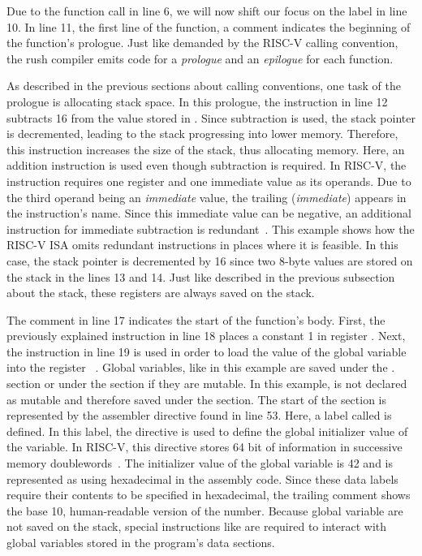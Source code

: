 Due to the function call in line 6, we will now shift our focus on the  label in line 10.
In line 11, the first line of the  function, a comment indicates the beginning of the function's prologue.
Just like demanded by the RISC-V calling convention, the rush compiler emits code for a \emph{prologue} and an \emph{epilogue} for each function.

As described in the previous sections about calling conventions, one task of the prologue is allocating stack space.
In this prologue, the  instruction in line 12 subtracts 16 from the value stored in .
Since subtraction is used, the stack pointer is decremented, leading to the stack progressing into lower memory.
Therefore, this instruction increases the size of the stack, thus allocating memory.
Here, an addition instruction is used even though subtraction is required.
In RISC-V, the  instruction requires one register and one immediate value as its operands.
Due to the third operand being an \emph{immediate} value, the trailing  (\emph{immediate}) appears in the instruction's name.
Since this immediate value can be negative, an additional instruction for immediate subtraction is redundant~\cite[reference card]{Patterson2017}.
This example shows how the RISC-V ISA omits redundant instructions in places where it is feasible.
In this case, the stack pointer is decremented by 16 since two 8-byte values are stored on the stack in the lines 13 and 14.
Just like described in the previous subsection about the stack, these registers are always saved on the stack.

The comment in line 17 indicates the start of the function's body.
First, the previously explained  instruction in line 18 places a constant 1 in register .
Next, the  instruction in line 19 is used in order to load the value of the global variable  into the register ~\cite[reference card]{Patterson2017}.
Global variables, like  in this example are saved under the . section or under the  section if they are mutable.
In this example,  is not declared as mutable and therefore saved under the  section.
The start of the  section is represented by the  assembler directive found in line 53.
Here, a label called  is defined.
In this label, the  directive is used to define the global initializer value of the variable.
In RISC-V, this directive stores 64 bit of information in successive memory doublewords~\cite[p.~39]{Patterson2017}.
The initializer value of the global variable is 42 and is represented as  using hexadecimal in the assembly code.
Since these data labels require their contents to be specified in hexadecimal, the trailing comment shows the base 10, human-readable version of the number.
Because global variable are not saved on the stack, special instructions like  are required to interact with global variables stored in the program's data sections.

